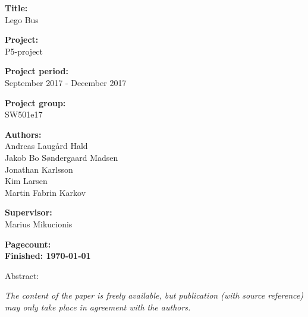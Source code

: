 \begin{minipage}[t]{0.48\textwidth}
\textbf{Title:} \\[5pt]\bigskip\hspace{2ex}
Lego Bus

\textbf{Project:} \\[5pt]\bigskip\hspace{2ex}
P5-project

\textbf{Project period:} \\[5pt]\bigskip\hspace{2ex}
September 2017 - December 2017

\textbf{Project group:} \\[5pt]\bigskip\hspace{2ex}
SW501e17

\textbf{Authors:} \\[5pt]\hspace*{2ex}
Andreas Laugård Hald
 \\\hspace*{2ex}
Jakob Bo Søndergaard Madsen
 \\\hspace*{2ex}
Jonathan Karlsson
 \\\hspace*{2ex}
Kim Larsen
 \\\hspace*{2ex}
Martin Fabrin Karkov 



\bigskip

\textbf{Supervisor:} \\[5pt]\hspace*{2ex}
Marius Mikucionis

\vspace*{1cm}

\textbf{Pagecount: \pageref{LastPage}} \\
\textbf{Finished: \today}

\end{minipage}
\hfill
\begin{minipage}[t]{0.483\textwidth}
Abstract: \\[5pt]
\fbox{\parbox{7cm}{\bigskip\bigskip}}
\end{minipage}

\vfill

{\footnotesize\itshape The content of the paper is freely available, but publication (with source reference) may only take place in agreement with the authors.}


